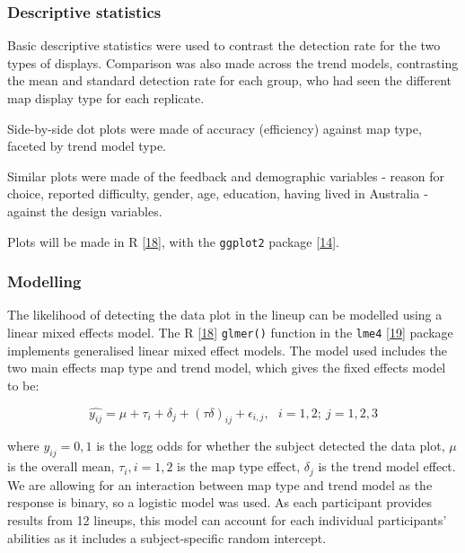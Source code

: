 \documentclass[conference,final,]{IEEEtran}
\begin{document}
\hypertarget{descriptive-statistics}{%
\subsubsection{Descriptive statistics}\label{descriptive-statistics}}

Basic descriptive statistics were used to contrast the detection rate for the two types of displays. Comparison was also made across the trend models, contrasting the mean and standard detection rate for each group, who had seen the different map display type for each replicate.

Side-by-side dot plots were made of accuracy (efficiency) against map type, faceted by trend model type.

Similar plots were made of the feedback and demographic variables - reason for choice, reported difficulty, gender, age, education, having lived in Australia - against the design variables.

Plots will be made in R {[}\protect\hyperlink{ref-RCore}{18}{]}, with the \texttt{ggplot2} package {[}\protect\hyperlink{ref-ggplot2}{14}{]}.

\hypertarget{modelling}{%
\subsubsection{Modelling}\label{modelling}}

The likelihood of detecting the data plot in the lineup can be modelled using a linear mixed effects model.
The R {[}\protect\hyperlink{ref-RCore}{18}{]} \texttt{glmer()} function in the \texttt{lme4} {[}\protect\hyperlink{ref-lme4}{19}{]} package implements generalised linear mixed effect models. The model used includes the two main effects map type and trend model, which gives the fixed effects model to be:

\[\widehat{y_{ij}} = \mu + \tau_i + \delta_j + (\tau\delta)_{ij} + \epsilon_{i,j}, ~~~ i=1,2; ~j=1,2,3\]

where \(y_{ij} = 0, 1\) is the logg odds for whether the subject detected the data plot, \(\mu\) is the overall mean, \(\tau_i, i=1,2\) is the map type effect, \(\delta_j\) is the trend model effect. We are allowing for an interaction between map type and trend model as the response is binary, so a logistic model was used. As each participant provides results from 12 lineups, this model can account for each individual participants' abilities as it includes a subject-specific random intercept.
\end{document}
